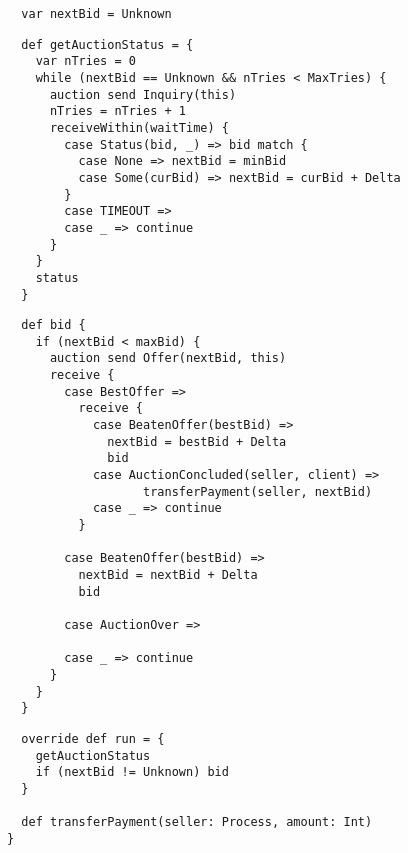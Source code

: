 {\begin{lstlisting}
  var nextBid = Unknown
\end{lstlisting}
\begin{lstlisting}
  def getAuctionStatus = {
    var nTries = 0
    while (nextBid == Unknown && nTries < MaxTries) {
      auction send Inquiry(this)
      nTries = nTries + 1
      receiveWithin(waitTime) {
        case Status(bid, _) => bid match {
          case None => nextBid = minBid
          case Some(curBid) => nextBid = curBid + Delta
        }
        case TIMEOUT =>
        case _ => continue
      }
    }
    status
  }
\end{lstlisting}
\begin{lstlisting}
  def bid {
    if (nextBid < maxBid) {
      auction send Offer(nextBid, this)
      receive {
        case BestOffer =>
          receive {
            case BeatenOffer(bestBid) =>
              nextBid = bestBid + Delta
              bid
            case AuctionConcluded(seller, client) =>
                   transferPayment(seller, nextBid)
            case _ => continue
          }

        case BeatenOffer(bestBid) =>
          nextBid = nextBid + Delta
          bid

        case AuctionOver =>

        case _ => continue
      }
    }
  }
\end{lstlisting}
\begin{lstlisting}
  override def run = {
    getAuctionStatus
    if (nextBid != Unknown) bid
  }

  def transferPayment(seller: Process, amount: Int)
}
\end{lstlisting}
}

